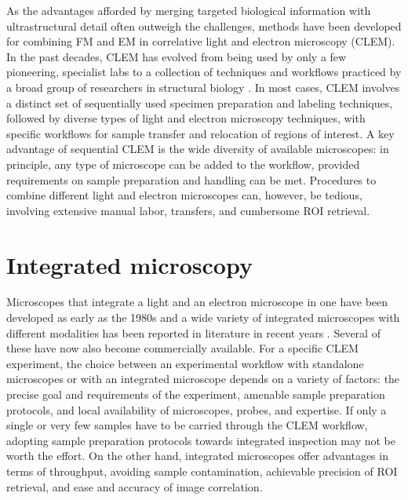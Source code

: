 As the advantages afforded by merging targeted biological information with ultrastructural detail often outweigh the challenges, methods have been developed for combining FM and EM in correlative light and electron microscopy (CLEM). In the past decades, CLEM has evolved from being used by only a few pioneering, specialist labs to a collection of techniques and workflows practiced by a broad group of researchers in structural biology \cite{de2015correlated, ando20182018}. In most cases, CLEM involves a distinct set of sequentially used specimen preparation and labeling techniques, followed by diverse types of light and electron microscopy techniques, with specific workflows for sample transfer and relocation of regions of interest. A key advantage of sequential CLEM is the wide diversity of available microscopes: in principle, any type of microscope can be added to the workflow, provided requirements on sample preparation and handling can be met. Procedures to combine different light and electron microscopes can, however, be tedious, involving extensive manual labor, transfers, and cumbersome ROI retrieval.


\section{Integrated microscopy}
\label{sec:1_integrated}

Microscopes that integrate a light and an electron microscope in one have been developed as early as the 1980s and a wide variety of integrated microscopes with different modalities has been reported in literature in recent years \cite{zonnevylle2013integration, timmermans2015contributed}. Several of these have now also become commercially available. For a specific CLEM experiment, the choice between an experimental workflow with standalone microscopes or with an integrated microscope depends on a variety of factors: the precise goal and requirements of the experiment, amenable sample preparation protocols, and local availability of microscopes, probes, and expertise. If only a single or very few samples have to be carried through the CLEM workflow, adopting sample preparation protocols towards integrated inspection may not be worth the effort. On the other hand, integrated microscopes offer advantages in terms of throughput, avoiding sample contamination, achievable precision of ROI retrieval, and ease and accuracy of image correlation.


